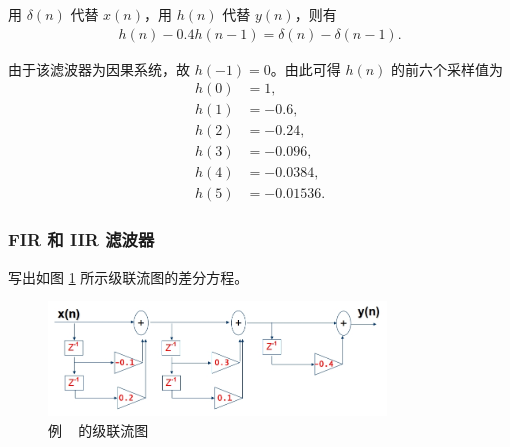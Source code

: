 \begin{solution}
    用 $\delta(n)$ 代替 $x(n)$，用 $h(n)$ 代替 $y(n)$，则有
    \begin{align*}
        h(n) - 0.4h(n - 1) = \delta(n) - \delta(n - 1).
    \end{align*}

    由于该滤波器为因果系统，故 $h(-1) = 0$。由此可得 $h(n)$ 的前六个采样值为
    \begin{align*}
        h(0) & = 1, \\
        h(1) & = -0.6, \\
        h(2) & = -0.24, \\
        h(3) & = -0.096, \\
        h(4) & = -0.0384, \\
        h(5) & = -0.01536.
    \end{align*}
\end{solution}

\subsubsection{FIR 和 IIR 滤波器}

\begin{example}
    \label{exercise:serial-flow-chart}
    写出如图 \ref{fig:serial-flow-chart} 所示级联流图的差分方程。
    \begin{figure}[H]
        \centering
        \includegraphics[width=0.8\textwidth]{chap4/img/serial_flow_chart.png}
        \caption{例 \theexample~ 的级联流图}
        \label{fig:serial-flow-chart}
    \end{figure}
\end{example}


